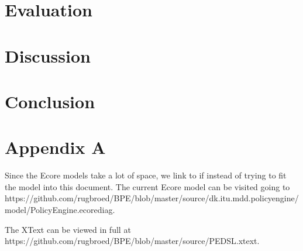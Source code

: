 \documentclass{llncs}
\begin{document}
\section{Evaluation}\label{sec:evaluation}

\section{Discussion}\label{sec:discussion}

\section{Conclusion}\label{sec:conclusion}

{}


\section{Appendix A}\label{sec:appendix-a}
Since the Ecore models take a lot of space, we link to if instead of trying to fit the model into this document. The current Ecore model can be visited going to https://github.com/rugbroed/BPE/blob/master/source/dk.itu.mdd.policyengine/model/PolicyEngine.ecorediag.

The XText can be viewed in full at https://github.com/rugbroed/BPE/blob/master/source/PEDSL.xtext.
\end{document}
